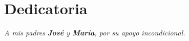 \chapter*{\hfill{\centering Dedicatoria}\hfill}
\normalsize
\justify

\vspace{19cm} %

\begin{flushright} 
\itshape\Large 

\textit{A mis padres \textbf{José} y \textbf{María}, por su apoyo incondicional.} %

\end{flushright}

